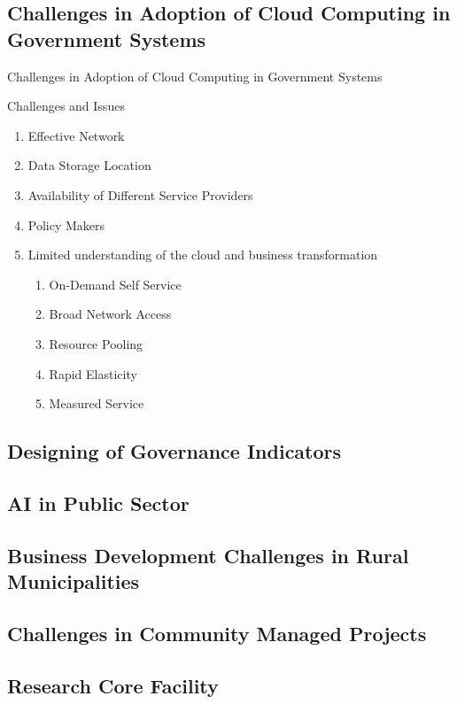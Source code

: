 \subsection{Challenges in Adoption of Cloud Computing in Government Systems}

\begin{frame}{Challenges in Adoption of Cloud Computing in Government Systems}
    \begin{alertblock}
         {Challenges and Issues}
         \begin{enumerate}
             \item Effective Network
             \item Data Storage Location
             \item Availability of Different Service Providers
             \item Policy Makers
             \item Limited understanding of the cloud and business transformation
             \begin{enumerate}
                 \item On-Demand Self Service
                 \item Broad Network Access
                 \item Resource Pooling
                 \item Rapid Elasticity
                 \item Measured Service
             \end{enumerate}
         \end{enumerate}
    \end{alertblock}
\end{frame}


\subsection{Designing of Governance Indicators}

\subsection{AI in Public Sector}

\subsection{Business Development Challenges in Rural Municipalities}

\subsection{Challenges in Community Managed Projects}

\subsection{Research Core Facility}

